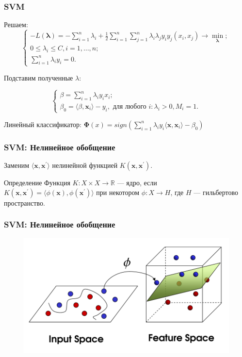 \documentclass[11pt]{beamer}
\begin{document}
	\begin{frame}
	\frametitle{SVM}
	
	Решаем: 
	$$
		\begin{cases}
			-L(\bm{\lambda}) = - \sum\limits_{i=1}^n \lambda_i + \frac{1}{2} \sum\limits_{i=1}^{n}\sum\limits_{j=1}^{n} \lambda_i \lambda_j y_i y_j (x_i, x_j) \rightarrow \min\limits_{\bm{\lambda}}; \\
			0 \leqslant \lambda_i \leqslant C, i = 1, \dotsc, n; \\
			\sum\limits_{i=1}^{n} \lambda_i y_i = 0.
		\end{cases}
	$$
	
	Подставим полученные $\lambda$:
	
	$$
	\begin{cases}
		\beta = \sum\limits_{i=1}^n \lambda_i y_i x_i;\\
		\beta_0 = \langle\beta, \bm{x}_i\rangle - y_i, \text{ для любого } i: \lambda_i > 0, M_i = 1.
	\end{cases}
	$$
	
	Линейный классификатор: $ \bm{\Phi}(x) = sign ( \sum\limits_{i=1}^{n} \lambda_i y_i \langle\bm{x}, \bm{x}_i\rangle - \beta_0) $
	\end{frame}	
	
	\begin{frame}
		\frametitle{SVM: Нелинейное обобщение}
		Заменим $\langle \bm{x}, \bm{x}^{'} \rangle$ нелинейной функцией $K(\bm{x}, \bm{x}^{'})$.
		
		\begin{block}{Определение}
			Функция $K: X \times X \rightarrow \mathbb{R}$ --- ядро, если $K(\bm{x}, \bm{x}^{'}) = \langle \phi(\bm{x}), \phi(\bm{x}^{'}) \rangle$ при некотором $\phi: X \rightarrow H$, где $H$ --- гильбертово пространство.
		\end{block}
	\end{frame}

	\begin{frame}
		\frametitle{SVM: Нелинейное обобщение}
		\begin{figure}
			\centering
			\includegraphics[width=0.7\linewidth]{../Report/imgs/kernels}
			
			\label{fig:margins}
		\end{figure}
	\end{frame}
\end{document}
